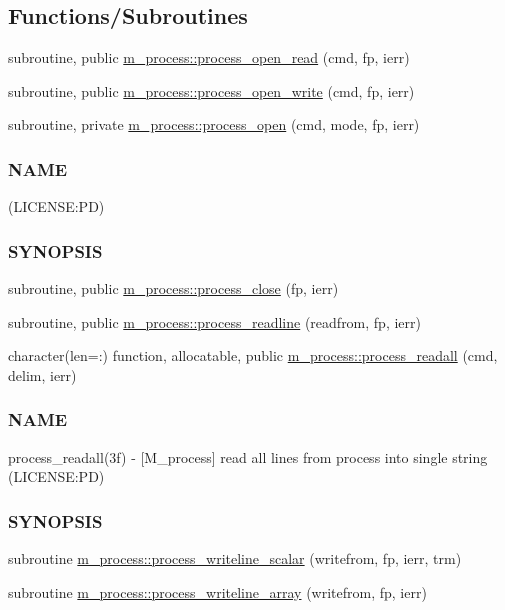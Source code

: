 \subsection*{Functions/\+Subroutines}
\begin{DoxyCompactItemize}
\item 
subroutine, public \mbox{\hyperlink{namespacem__process_aaaf4d1926258a4cec7da7fc61c38c79d}{m\+\_\+process\+::process\+\_\+open\+\_\+read}} (cmd, fp, ierr)
\item 
subroutine, public \mbox{\hyperlink{namespacem__process_aa6ed1404ab3472f5068ed15a7a01defc}{m\+\_\+process\+::process\+\_\+open\+\_\+write}} (cmd, fp, ierr)
\item 
subroutine, private \mbox{\hyperlink{namespacem__process_a3c0f543a9ceff2671041d73660f60a59}{m\+\_\+process\+::process\+\_\+open}} (cmd, mode, fp, ierr)
\begin{DoxyCompactList}\small\item\em \subsubsection*{N\+A\+ME}

(L\+I\+C\+E\+N\+SE\+:PD) \subsubsection*{S\+Y\+N\+O\+P\+S\+IS}\end{DoxyCompactList}\item 
subroutine, public \mbox{\hyperlink{namespacem__process_ab4c5cad3fb46686f0c9b71c3a634f6ae}{m\+\_\+process\+::process\+\_\+close}} (fp, ierr)
\item 
subroutine, public \mbox{\hyperlink{namespacem__process_acbc72c5ed371430a471aa1f3010fbbda}{m\+\_\+process\+::process\+\_\+readline}} (readfrom, fp, ierr)
\item 
character(len=\+:) function, allocatable, public \mbox{\hyperlink{namespacem__process_a7dd759a1344789477ae1e205d7fa9a51}{m\+\_\+process\+::process\+\_\+readall}} (cmd, delim, ierr)
\begin{DoxyCompactList}\small\item\em \subsubsection*{N\+A\+ME}

process\+\_\+readall(3f) -\/ \mbox{[}M\+\_\+process\mbox{]} read all lines from process into single string (L\+I\+C\+E\+N\+SE\+:PD) \subsubsection*{S\+Y\+N\+O\+P\+S\+IS}\end{DoxyCompactList}\item 
subroutine \mbox{\hyperlink{namespacem__process_a72527c0ec0af26dcb14b8bfad6dcd482}{m\+\_\+process\+::process\+\_\+writeline\+\_\+scalar}} (writefrom, fp, ierr, trm)
\item 
subroutine \mbox{\hyperlink{namespacem__process_a08887a918eba167ceacddf58ca084270}{m\+\_\+process\+::process\+\_\+writeline\+\_\+array}} (writefrom, fp, ierr)
\end{DoxyCompactItemize}
